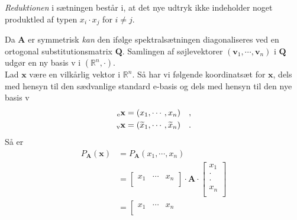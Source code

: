 \begin{aha}
\emph{Reduktionen} i sætningen består i, at det nye udtryk ikke indeholder noget produktled af typen $x_{i}\cdot x_{j}$ for $i \neq j$.
\end{aha}

\begin{bevis}
Da $\mathbf{A}$ er symmetrisk \emph{kan} den ifølge spektralsætningen  diagonaliseres ved en ortogonal substitutionsmatrix $\mathbf{Q}$. Samlingen af søjlevektorer $(\mathbf{v}_{1}, \cdots , \mathbf{v}_{n} )$ i $\mathbf{Q}$ udgør en ny basis v i $(\mathbb{R}^{n}, \bm{\cdot})$. \\

Lad $\mathbf{x}$ være en vilkårlig vektor i $\mathbb{R}^{n}$. Så har vi følgende koordinatsæt for $\mathbf{x}$, dels med hensyn til den sædvanlige standard e-basis og dels med hensyn til den nye basis v
\begin{equation}
\begin{aligned}
{_\mathrm{e}\mathbf{\mathbf{x}}} &= (x_{1}, \cdots , x_{n}) \quad , \\
{_\mathrm{v}\mathbf{\mathbf{x}}}&= (\widetilde{x}_{1}, \cdots , \widetilde{x}_{n}) \quad.
\end{aligned}
\end{equation}
Så er
\begin{equation}
\begin{aligned}
P_{\mathbf{A}}(\mathbf{x}) &= P_{\mathbf{A}}(x_{1}, \cdots , x_{n}) \\
& = \left[
      \begin{array}{ccc}
        x_{1} & \cdots & x_{n} \\
      \end{array}
    \right] \cdot \mathbf{A} \cdot \left[
                                     \begin{array}{c}
                                       x_{1} \\
                                       \cdot \\
                                       \cdot \\
                                       x_{n} \\
                                     \end{array}
                                   \right] \\
& = \left[
      \begin{array}{ccc}
        x_{1} & \cdots & x_{n} \\
      \end{array}

\end{aligned}
\end{equation}
\end{bevis}
